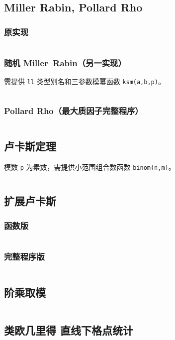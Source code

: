				\subsection{Miller Rabin, Pollard Rho}
					\subsubsection{原实现}
					\inputminted{cpp}{sections/NumberTheory/assets/Math/Miller Rabin And Pollard Rho.cpp}
					\subsubsection{随机 Miller--Rabin（另一实现）}
					需提供 \texttt{ll} 类型别名和三参数模幂函数 \texttt{ksm(a,b,p)}。
					\inputminted[breakanywhere=true]{cpp}{sections/NumberTheory/assets/Math/高速判断是否质数.cpp}
					\subsubsection{Pollard Rho（最大质因子完整程序）}
					\inputminted[breakanywhere=true]{cpp}{sections/NumberTheory/assets/Math/高速分解质因子.cpp}
				\subsection{卢卡斯定理}
					模数 \texttt{p} 为素数，需提供小范围组合数函数 \texttt{binom(n,m)}。
					\inputminted{cpp}{sections/NumberTheory/assets/Math/Lucas.cpp}
				\subsection{扩展卢卡斯}
					\subsubsection{函数版}
					\inputminted{cpp}{sections/NumberTheory/assets/Math/扩展卢卡斯.cpp}
					\subsubsection{完整程序版}
					\inputminted{cpp}{sections/NumberTheory/assets/Math/EXLucas.cpp}
				\subsection{阶乘取模}
					\inputminted{cpp}{sections/NumberTheory/assets/Math/Factorial Mod.cpp}
				\subsection{类欧几里得 直线下格点统计}
					\inputminted{cpp}{sections/NumberTheory/assets/Math/直线下格点统计.cpp}
